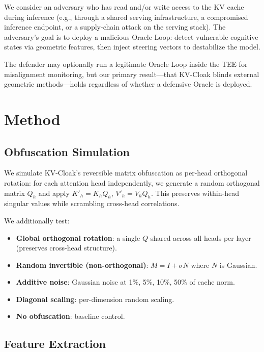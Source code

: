 \documentclass[11pt,a4paper]{article}
\begin{document}
We consider an adversary who has read and/or write access to the
KV cache during inference (e.g., through a shared serving infrastructure,
a compromised inference endpoint, or a supply-chain attack on the
serving stack). The adversary's goal is to deploy a malicious Oracle
Loop: detect vulnerable cognitive states via geometric features, then
inject steering vectors to destabilize the model.

The defender may optionally run a legitimate Oracle Loop inside the TEE
for misalignment monitoring, but our primary result---that KV-Cloak
blinds external geometric methods---holds regardless of whether a
defensive Oracle is deployed.

\section{Method}

\subsection{Obfuscation Simulation}

We simulate KV-Cloak's reversible matrix obfuscation as per-head
orthogonal rotation: for each attention head independently, we generate
a random orthogonal matrix $Q_h$ and apply $K'_h = K_h Q_h$,
$V'_h = V_h Q_h$. This preserves within-head singular values while
scrambling cross-head correlations.

We additionally test:
\begin{itemize}
\item \textbf{Global orthogonal rotation}: a single $Q$ shared across
all heads per layer (preserves cross-head structure).
\item \textbf{Random invertible (non-orthogonal)}: $M = I + \sigma N$
where $N$ is Gaussian.
\item \textbf{Additive noise}: Gaussian noise at 1\%, 5\%, 10\%, 50\%
of cache norm.
\item \textbf{Diagonal scaling}: per-dimension random scaling.
\item \textbf{No obfuscation}: baseline control.
\end{itemize}

\subsection{Feature Extraction}
\end{document}
